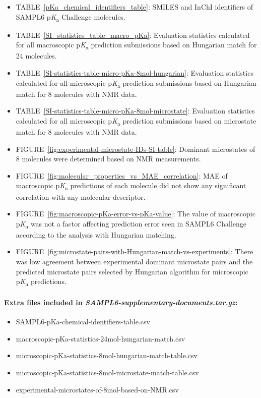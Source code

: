 \documentclass[9pt,lineno,final]{elife}
\newcommand{\pKa}{p\textit{K}\textsubscript{a}}
\begin{document}
\begin{itemize}
\item TABLE~\ref{pKa_chemical_identifiers_table}: SMILES and InChI identifiers of SAMPL6 \pKa{}  Challenge molecules.
\item TABLE~\ref{SI_statistics_table_macro_pKa}: Evaluation statistics calculated for all macroscopic \pKa{} prediction submissions based on Hungarian match for 24 molecules.
\item TABLE~\ref{SI-statistics-table-micro-pKa-8mol-hungarian}: Evaluation statistics calculated for all microscopic \pKa{} prediction submissions based on Hungarian match for 8 molecules with NMR data.
\item TABLE~\ref{SI-statistics-table-micro-pKa-8mol-microstate}: Evaluation statistics calculated for all microscopic \pKa{} prediction submissions based on microstate match for 8 molecules with NMR data.
\item FIGURE~\ref{fig:experimental-microstate-IDs-SI-table}: Dominant microstates of 8 molecules were determined based on NMR measurements.
\item FIGURE~\ref{fig:molecular_properties_vs_MAE_correlation}: MAE of macroscopic \pKa{} predictions of each molecule did not show any significant correlation with any molecular descriptor.
\item FIGURE~\ref{fig:macroscopic-pKa-error-vs-pKa-value}: The value of macroscopic \pKa{} was not a factor affecting prediction error seen in SAMPL6 Challenge according to the analysis with Hungarian matching.
\item FIGURE~\ref{fig:microstate-pairs-with-Hungarian-match-vs-experiments}: There was low agreement between experimental dominant microstate pairs and the predicted microstate pairs selected by Hungarian algorithm for microscopic \pKa{} predictions. 




\end{itemize}

\paragraph{Extra files included in \textit{SAMPL6-supplementary-documents.tar.gz}:}  
\begin{itemize}
\item SAMPL6-pKa-chemical-identifiers-table.csv 
\item macroscopic-pKa-statistics-24mol-hungarian-match.csv
\item microscopic-pKa-statistics-8mol-hungarian-match-table.csv
\item microscopic-pKa-statistics-8mol-microstate-match-table.csv
\item experimental-microstates-of-8mol-based-on-NMR.csv  
\end{itemize}
\end{document}
